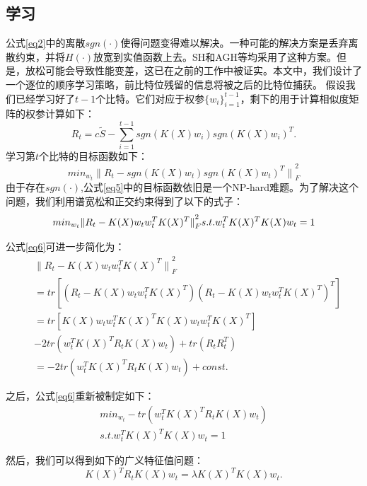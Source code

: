 \message{ !name(SGH.tex)}\documentclass[prodmode,acmtecs]{acmsmall}
\begin{document}
\subsection{学习}
公式\ref{eq2}中的离散$sgn(\cdot)$使得问题变得难以解决。一种可能的解决方案是丢弃离散约束，并将$H(\cdot)$放宽到实值函数上去。SH\cite{NIPS2008_3383}和AGH\cite{Liu2011Hashing}等均采用了这种方案。但是，放松可能会导致性能变差，这已在之前的工作中被证实\cite{W2012Isotropic,Zhang2014Large}。本文中，我们设计了一个逐位的顺序学习策略，前比特位残留的信息将被之后的比特位捕获\cite{6247912,Zhang2014Large}。
假设我们已经学习好了$t-1$个比特。它们对应于权参$\{w_i\}^{t-1}_{i=1}$，剩下的用于计算相似度矩阵的权参计算如下：
\begin{equation}
R_t=c\tilde{S}-\sum^{t-1}_{i=1}{sgn(K(X)w_i)sgn(K(X)w_i)^T}.
\end{equation}
学习第$t$个比特的目标函数如下：
\begin{displaymath}
min_{w_t}{\|R_t-sgn(K(X)w_t)sgn(K(X)w_t)^T\|}^2_F
\label{eq5}
\end{displaymath}
由于存在$sgn(\cdot)$,公式\ref{eq5}中的目标函数依旧是一个NP-hard难题。为了解决这个问题，我们利用谱宽松\cite{NIPS2008_3383}和正交约束得到了以下的式子：
\begin{equation}
min_{w_t}{\|R_t-K(X)w_tw_t^TK(X)^T\|}^2_F\\
s.t. w^T_tK(X)^TK(X)w_t=1
\label{eq6}
\end{equation}

公式\ref{eq6}可进一步简化为：
\begin{equation*}
\begin{split}
&{\|R_t-K(X)w_tw_t^TK(X)^T\|}^2_F\\
 &=tr[(R_t-K(X)w_tw_t^TK(X)^T)(R_t-K(X)w_tw_t^TK(X)^T)^T]\\
 &=tr[K(X)w_tw_t^TK(X)^TK(X)w_tw_t^TK(X)^T]\\
  & -2tr(w^T_tK(X)^TR_tK(X)w_t)+tr(R_tR^T_t)\\
& =-2tr(w^T_tK(X)^TR_tK(X)w_t)+const.
\end{split}
\end{equation*}

之后，公式\ref{eq6}重新被制定如下：
\begin{equation}
\begin{split}
min_{w_t}-tr(w^T_tK(X)^TR_tK(X)w_t)\\
s.t.w^T_tK(X)^TK(X)w_t=1
\label{eq7}
\end{split}
\end{equation}


然后，我们可以得到如下的广义特征值问题：
\begin{equation*}
K(X)^TR_tK(X)w_t= \lambda K(X)^TK(X)w_t.
\end{equation*}
\end{document}
